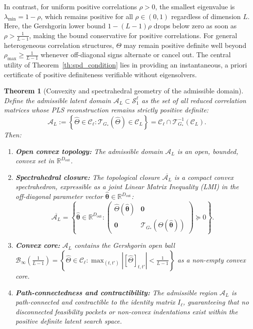 \documentclass[default,sn-mathphys,Numbered]{sn-jnl}
\theoremstyle{thmstyleone}
\newtheorem{theorem}{Theorem}
\theoremstyle{thmstylethree}
\theoremstyle{thmstyletwo}
\newcommand{\outp}{\text{out}}
\begin{document}
In contrast, for uniform positive correlations $\rho > 0$, the smallest eigenvalue is $\lambda_{\min} = 1 - \rho$, which remains positive for all $\rho \in (0, 1)$ regardless of dimension $L$. Here, the Gershgorin lower bound $1 - (L-1)\rho$ drops below zero as soon as $\rho > \frac{1}{L-1}$, making the bound conservative for positive correlations. For general heterogeneous correlation structures, $\Theta$ may remain positive definite well beyond $\rho_{\max} \ge \frac{1}{L-1}$ whenever off-diagonal signs alternate or cancel out. The central utility of Theorem~\ref{th:spd_condition} lies in providing an instantaneous, a priori certificate of positive definiteness verifiable without eigensolvers.

\begin{theorem}[Convexity and spectrahedral geometry of the admissible domain]
\label{th:admissible_convexity}
Define the admissible latent domain $\mathcal{A}_L \subset \mathcal{S}_1^\ell$ as the set of all reduced correlation matrices whose PLS reconstruction remains strictly positive definite:
\begin{equation}
\label{eq:admissible_domain}
\mathcal{A}_L := \left\{ \hat{\Theta} \in \mathcal{C}_\ell : \mathcal{T}_{G_*}(\hat{\Theta}) \in \mathcal{C}_L \right\} = \mathcal{C}_\ell \cap \mathcal{T}_{G_*}^{-1}(\mathcal{C}_L).
\end{equation}
Then:
\begin{enumerate}
    \item[(a)] \textbf{Open convex topology:} The admissible domain $\mathcal{A}_L$ is an open, bounded, convex set in $\mathbb{R}^{D_{\outp}}$.
    \item[(b)] \textbf{Spectrahedral closure:} The topological closure $\overline{\mathcal{A}_L}$ is a compact convex spectrahedron, expressible as a joint Linear Matrix Inequality (LMI) in the off-diagonal parameter vector $\hat{\bm{\theta}} \in \mathbb{R}^{D_{\outp}}$:
    \begin{equation}
    \label{eq:lmi_admissible}
    \overline{\mathcal{A}_L} = \left\{ \hat{\bm{\theta}} \in \mathbb{R}^{D_{\outp}} : \begin{pmatrix} \hat{\Theta}(\hat{\bm{\theta}}) & \bm{0} \\ \bm{0} & \mathcal{T}_{G_*}(\hat{\Theta}(\hat{\bm{\theta}})) \end{pmatrix} \succeq 0 \right\}.
    \end{equation}
    \item[(c)] \textbf{Convex core:} $\mathcal{A}_L$ contains the Gershgorin open ball $\mathcal{B}_{\infty}\left(\frac{1}{L-1}\right) = \left\{ \hat{\Theta} \in \mathcal{C}_\ell : \max_{(t, t')} |[\hat{\Theta}]_{t, t'}| < \frac{1}{L-1} \right\}$ as a non-empty convex core.
    \item[(d)] \textbf{Path-connectedness and contractibility:} The admissible region $\mathcal{A}_L$ is path-connected and contractible to the identity matrix $I_\ell$, guaranteeing that no disconnected feasibility pockets or non-convex indentations exist within the positive definite latent search space.
\end{enumerate}
\end{theorem}
\end{document}
